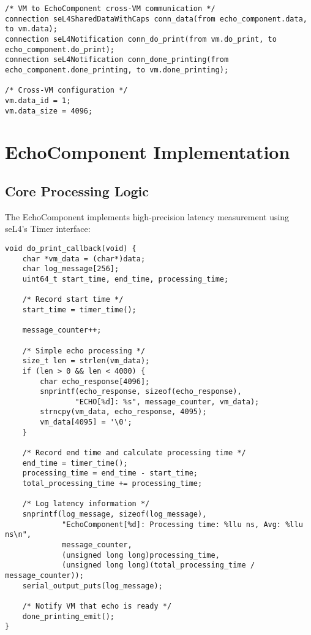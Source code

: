 \documentclass[12pt,a4paper]{article}
\begin{document}
\begin{lstlisting}[style=camkes, caption=Cross-VM connector configuration]
/* VM to EchoComponent cross-VM communication */
connection seL4SharedDataWithCaps conn_data(from echo_component.data, to vm.data);
connection seL4Notification conn_do_print(from vm.do_print, to echo_component.do_print);
connection seL4Notification conn_done_printing(from echo_component.done_printing, to vm.done_printing);

/* Cross-VM configuration */
vm.data_id = 1;
vm.data_size = 4096;
\end{lstlisting}

\section{EchoComponent Implementation}

\subsection{Core Processing Logic}

The EchoComponent implements high-precision latency measurement using seL4's Timer interface:

\begin{lstlisting}[style=camkes, caption=EchoComponent message processing with timing]
void do_print_callback(void) {
    char *vm_data = (char*)data;
    char log_message[256];
    uint64_t start_time, end_time, processing_time;
    
    /* Record start time */
    start_time = timer_time();
    
    message_counter++;
    
    /* Simple echo processing */
    size_t len = strlen(vm_data);
    if (len > 0 && len < 4000) {
        char echo_response[4096];
        snprintf(echo_response, sizeof(echo_response), 
                "ECHO[%d]: %s", message_counter, vm_data);
        strncpy(vm_data, echo_response, 4095);
        vm_data[4095] = '\0';
    }
    
    /* Record end time and calculate processing time */
    end_time = timer_time();
    processing_time = end_time - start_time;
    total_processing_time += processing_time;
    
    /* Log latency information */
    snprintf(log_message, sizeof(log_message),
             "EchoComponent[%d]: Processing time: %llu ns, Avg: %llu ns\n", 
             message_counter, 
             (unsigned long long)processing_time,
             (unsigned long long)(total_processing_time / message_counter));
    serial_output_puts(log_message);
    
    /* Notify VM that echo is ready */
    done_printing_emit();
}
\end{lstlisting}
\end{document}
